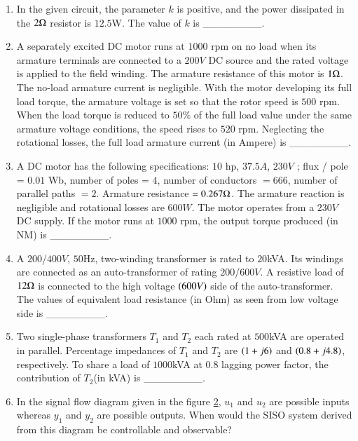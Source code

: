 \documentclass[journal]{IEEEtran}
\begin{document}
\begin{enumerate}
    \item In the given circuit, the parameter $k$ is positive, and the power dissipated in the $2 \ohm$ resistor is $12.5$W. The value of $k$ is \_\_\_\_\_\_\_\_.
        \begin{figure}[H]
            \centering
            
            \caption{}
            \label{fig57}
        \end{figure}

    \item A separately excited DC motor runs at $1000$ rpm on no load when its armature terminals are connected to a $200V$ DC source and the rated voltage is applied to the field winding. The armature resistance of this motor is $1  \ohm$. The no-load armature current is negligible. With the motor developing its full load torque, the armature voltage is set so that the rotor speed is $500$ rpm. When the load torque is reduced to $50\%$ of the full load value under the same armature voltage conditions, the speed rises to $520$ rpm. Neglecting the rotational losses, the full load armature current (in Ampere) is \_\_\_\_\_\_\_\_.
    \item A DC motor has the following specifications: $10$ hp, $37.5A$, $230V$ ; flux / pole = $0.01$ Wb, number of poles = $4$, number of conductors $=666$, number of parallel paths $=2$. Armature resistance $=0.267 \ohm$. The armature reaction is negligible and rotational losses are $600W$. The motor operates from a $230V$ DC supply. If the motor runs at $1000$ rpm, the output torque produced (in NM) is \_\_\_\_\_\_\_\_.
    \item A $200$/$400 V$, $50$Hz, two-winding transformer is rated to $20$kVA. Its windings are connected as an auto-transformer of rating $200$/$600V$. A resistive load of $12 \ohm$ is connected to the high voltage $\left(600V\right)$ side of the auto-transformer. The values of equivalent load resistance (in Ohm) as seen from low voltage side is \_\_\_\_\_\_\_\_.
    \item Two single-phase transformers $T_1$ and $T_2$ each rated at $500$kVA are operated in parallel. Percentage impedances of $T_1$ and $T_2$ are $\left(1 + j6\right)$ and $\left(0.8 + j4.8\right)$, respectively. To share a load of $1000$kVA at $0.8$ lagging power factor, the contribution of $T_2$(in kVA) is \_\_\_\_\_\_\_\_.

    \item In the signal flow diagram given in the figure \ref{fig62}, $u_1$ and $u_2$ are possible inputs whereas $y_1$ and $y_2$ are possible outputs. When would the SISO system derived from this diagram be controllable and observable?
    \begin{figure}[H]
        \centering
        
        \caption{}
        \label{fig62}
    \end{figure}


\end{enumerate}
\end{document}
